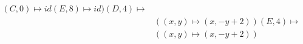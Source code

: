 \documentclass[preview]{standalone}
\begin{document}
\begin{align*}
(C,0) \mapsto id (E,8) \mapsto id) (D,4) \mapsto &\\&( (x,y) \mapsto (x, -y + 2)) (E,4) \mapsto &\\&( (x,y) \mapsto (x, -y + 2))
\end{align*}
\end{document}
